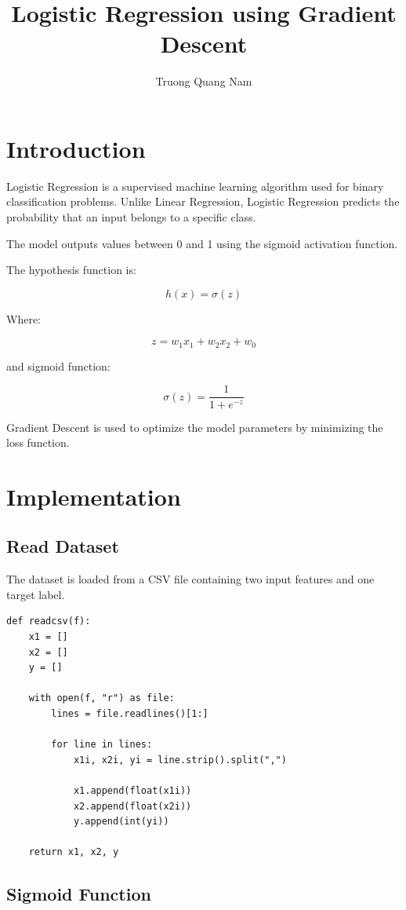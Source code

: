 \documentclass{article}
\title{Logistic Regression using Gradient Descent}
\author{Truong Quang Nam}
\begin{document}
\maketitle

\section{Introduction}

Logistic Regression is a supervised machine learning algorithm used for binary classification problems. Unlike Linear Regression, Logistic Regression predicts the probability that an input belongs to a specific class.

The model outputs values between 0 and 1 using the sigmoid activation function.

The hypothesis function is:

\[
h(x) = \sigma(z)
\]

Where:

\[
z = w_1x_1 + w_2x_2 + w_0
\]

and sigmoid function:

\[
\sigma(z) = \frac{1}{1 + e^{-z}}
\]

Gradient Descent is used to optimize the model parameters by minimizing the loss function.

\section{Implementation}

\subsection{Read Dataset}

The dataset is loaded from a CSV file containing two input features and one target label.

\begin{lstlisting}
def readcsv(f):
    x1 = []
    x2 = []
    y = []

    with open(f, "r") as file:
        lines = file.readlines()[1:]

        for line in lines:
            x1i, x2i, yi = line.strip().split(",")

            x1.append(float(x1i))
            x2.append(float(x2i))
            y.append(int(yi))

    return x1, x2, y
\end{lstlisting}

\subsection{Sigmoid Function}
\end{document}
